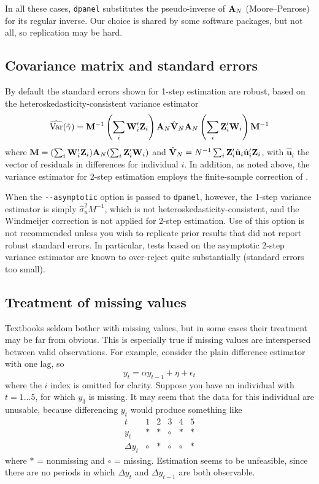 In all these cases, \texttt{dpanel} substitutes the pseudo-inverse of
$\mathbf{A}_N$ (Moore--Penrose) for its regular inverse. Our choice is shared
by some software packages, but not all, so replication may be hard.

\subsection{Covariance matrix and standard errors}

By default the standard errors shown for 1-step estimation are robust,
based on the heteroskedasticity-consistent variance estimator
\[
  \widehat{\rm Var}(\hat{\gamma}) =
    \mathbf{M}^{-1} \left(\sum_i\mathbf{W}_i'\mathbf{Z}_i\right)
    \mathbf{A}_N\hat{\mathbf{V}}_N\mathbf{A}_N
    \left(\sum_i\mathbf{Z}_i'\mathbf{W}_i\right) \mathbf{M}^{-1}
\]
where $\mathbf{M} = (\sum_i\mathbf{W}_i'\mathbf{Z}_i) \mathbf{A}_N (\sum_i\mathbf{Z}_i'\mathbf{W}_i)$ and
$\hat{\mathbf{V}}_N = N^{-1} \sum_i
\mathbf{Z}_i'\hat{\mathbf{u}}_i\hat{\mathbf{u}}_i'\mathbf{Z}_i$, with
$\hat{\mathbf{u}}_i$ the vector of residuals in differences for
individual $i$.  In addition, as noted above, the variance estimator
for 2-step estimation employs the finite-sample correction of
\cite{Windmeijer05}.

When the \verb|--asymptotic| option is passed to \texttt{dpanel},
however, the 1-step variance estimator is simply
$\hat{\sigma}_u^2 M^{-1}$, which is not heteroskedasticity-consistent,
and the Windmeijer correction is not applied for 2-step
estimation. Use of this option is not recommended unless you wish to
replicate prior results that did not report robust standard errors. In
particular, tests based on the asymptotic 2-step variance estimator
are known to over-reject quite substantially (standard errors too
small).

\subsection{Treatment of missing values}

Textbooks seldom bother with missing values, but in some cases their
treatment may be far from obvious. This is especially true if missing
values are interspersed between valid observations. For example,
consider the plain difference estimator with one lag, so
\[
y_t = \alpha y_{t-1} + \eta + \epsilon_t
\]
where the $i$ index is omitted for clarity. Suppose you have an
individual with $t=1\ldots5$, for which $y_3$ is missing. It may seem
that the data for this individual are unusable, because
differencing $y_t$ would produce something like
\[
\begin{array}{c|ccccc}
  t & 1 & 2 & 3 & 4 & 5 \\
  \hline
  y_t & * & * & \circ & * & * \\
  \Delta y_t & \circ & * & \circ & \circ & *
\end{array}
\]
where $*$ = nonmissing and $\circ$ = missing. Estimation seems to be
unfeasible, since there are no periods in which $\Delta y_t$ and
$\Delta y_{t-1}$ are both observable.

